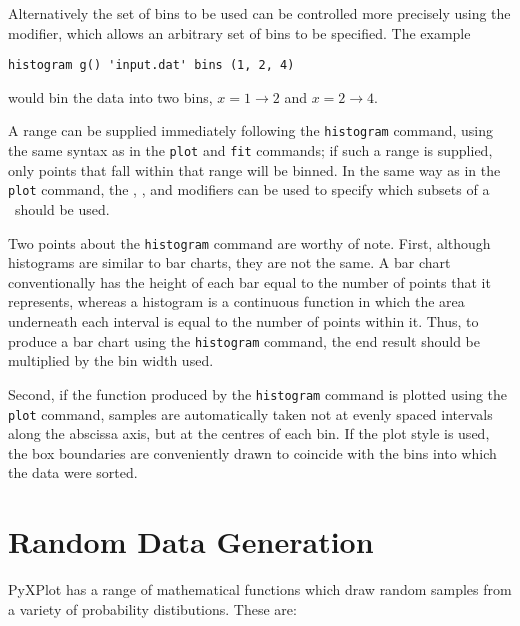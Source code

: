 Alternatively the set of bins to be used can be controlled more precisely using
the  modifier, which allows an arbitrary set of bins to be
specified. The example

\begin{verbatim}
histogram g() 'input.dat' bins (1, 2, 4)
\end{verbatim}

\noindent would bin the data into two bins, $x=1\to 2$ and $x=2\to 4$.

A range can be supplied immediately following the {\tt histogram} command,
using the same syntax as in the {\tt plot} and {\tt fit} commands; if such a
range is supplied, only points that fall within that range will be binned.  In
the same way as in the {\tt plot} command, the ,
,  and  modifiers can be used to
specify which subsets of a \datafile\ should be used.

Two points about the {\tt histogram} command are worthy of note. First,
although histograms are similar to bar charts, they are not the same.  A bar
chart conventionally has the height of each bar equal to the number of points
that it represents, whereas a histogram is a continuous function in which the
area underneath each interval is equal to the number of points within it.
Thus, to produce a bar chart using the {\tt histogram} command, the end result
should be multiplied by the bin width used.

Second, if the function produced by the {\tt histogram} command is plotted
using the {\tt plot} command, samples are automatically taken not at evenly
spaced intervals along the abscissa axis, but at the centres of each bin. If
the  plot style is used, the box boundaries are conveniently
drawn to coincide with the bins into which the data were sorted.

\section{Random Data Generation}

PyXPlot has a range of mathematical functions which draw random samples from a
variety of probability distibutions. These are:

